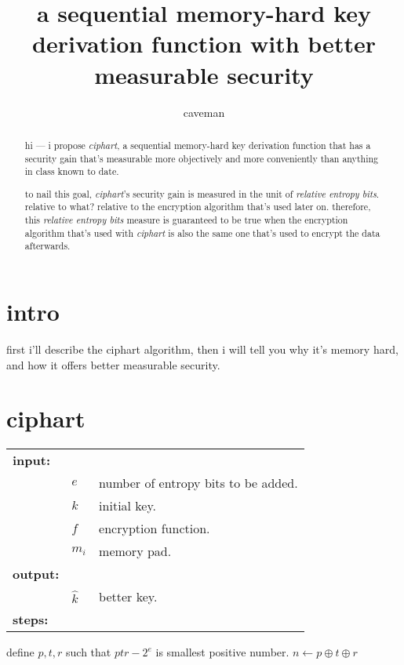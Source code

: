 \documentclass{article}
\author{caveman}
\title{a sequential memory-hard key derivation function with better
measurable security}
\begin{document}
\maketitle
\begin{abstract}
hi --- i propose \emph{ciphart}, a sequential memory-hard key derivation
function that has a security gain that's measurable more objectively and
more conveniently than anything in class known to date.

to nail this goal, \emph{ciphart}'s security gain is measured in the unit
of \emph{relative entropy bits}.  relative to what?  relative to the
encryption algorithm that's used later on.  therefore, this \emph{relative
entropy bits} measure is guaranteed to be true when the encryption
algorithm that's used with \emph{ciphart} is also the same one that's used
to encrypt the data afterwards.
\end{abstract}

\section{intro}
first i'll describe the ciphart algorithm, then i will tell you why it's
memory hard, and how it offers better measurable security.

\section{ciphart}

\begin{tabular}{lll}
    \textbf{input:}  & &\\
             & $e$ & number of entropy bits to be added.\\
             & $k$ & initial key.\\
             & $f$ & encryption function.\\
             & $m_i$ & memory pad.\\
    \textbf{output:} & &\\
             & $\hat k$ & better key.\\
    \textbf{steps:}  & &\\
\end{tabular}

\begin{algorithmic}
    \STATE define $p,t,r$ such that $ptr - 2^e$ is smallest positive
    number.
                \STATE $n \leftarrow p \oplus t \oplus r$
            \ENDFOR
        \ENDFOR
    \ENDFOR
\end{algorithmic}
\end{document}
